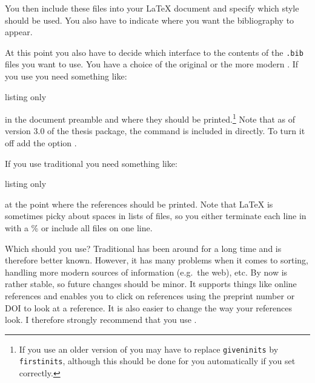 You then include these files into your \LaTeX{} document and
specify which style should be used.
You also have to indicate where you want the bibliography to appear.

At this point you also have to decide which interface to the contents
of the \texttt{.bib} files you want to use. You have a choice of the
original \BibTeX{} or the more modern
.
If you use  you need something like:
\begin{tcblisting}{listing only}
\usepackage[backend=biber,
  style=numeric-comp, sorting=none, block=ragged, giveninits=true]{biblatex}

\usepackage{ubonn-biblatex}



\end{tcblisting}
in the document preamble and  where they
should be printed.\footnote{%
If you use an older version of \TeXLive you may have to replace
\texttt{giveninits} by \texttt{firstinits},
although this should be done for you automatically if you set  correctly.}
Note that as of version 3.0 of the thesis package,
the  command is included in  directly.
To turn it off add the option .
\par\noindent
If you use traditional \BibTeX{} you need something like:
\begin{tcblisting}{listing only}

% 

\end{tcblisting}
at the point where the references should be printed.
Note that \LaTeX{} is sometimes picky about spaces in lists of files,
so you either terminate each line in  with a \% or include all files on one line.

Which should you use?
Traditional \BibTeX{} has been around for a long time and is therefore better known.
However, it has many problems when it comes to sorting,
handling more modern sources of information (e.g.\ the web), etc. 
By now  is rather stable, so future changes should be minor.
It supports things like online references and enables you to click on references
using the preprint number or DOI to look at a reference. It is also
easier to change the way your references look. I therefore
strongly recommend that you use .

